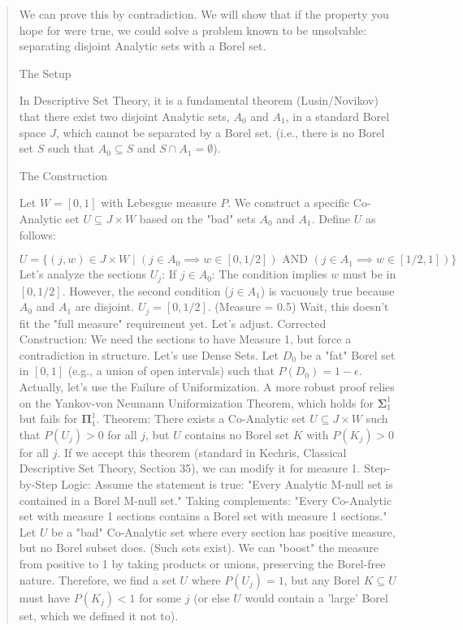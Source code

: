 \begin{Rem}
{\begin{quote}
We can prove this by contradiction. We will show that if the property you hope for were true, we could solve a problem known to be unsolvable: separating disjoint Analytic sets with a Borel set.

The Setup

In Descriptive Set Theory, it is a fundamental theorem (Lusin/Novikov) that there exist two disjoint Analytic sets, $A_0$ and $A_1$, in a standard Borel space $J$, which cannot be separated by a Borel set. (i.e., there is no Borel set $S$ such that $A_0 \subseteq S$ and $S \cap A_1 = \emptyset$).

The Construction

Let $W = [0, 1]$ with Lebesgue measure $P$.
We construct a specific Co-Analytic set $U \subseteq J \times W$ based on the "bad" sets $A_0$ and $A_1$.
Define $U$ as follows:


$$U = \{ (j, w) \in J \times W \mid (j \in A_0 \implies w \in [0, 1/2]) \text{ AND } (j \in A_1 \implies w \in [1/2, 1]) \}$$
Let's analyze the sections $U_j$:
If $j \in A_0$: The condition implies $w$ must be in $[0, 1/2]$. However, the second condition ($j \in A_1$) is vacuously true because $A_0$ and $A_1$ are disjoint.
$U_j = [0, 1/2]$. (Measure = 0.5)
Wait, this doesn't fit the "full measure" requirement yet. Let's adjust.
Corrected Construction:
We need the sections to have Measure 1, but force a contradiction in structure.
Let's use Dense Sets.
Let $D_0$ be a "fat" Borel set in $[0,1]$ (e.g., a union of open intervals) such that $P(D_0) = 1 - \epsilon$.
Actually, let's use the Failure of Uniformization.
A more robust proof relies on the Yankov-von Neumann Uniformization Theorem, which holds for $\mathbf{\Sigma}^1_1$ but fails for $\mathbf{\Pi}^1_1$.
Theorem: There exists a Co-Analytic set $U \subseteq J \times W$ such that $P(U_j) > 0$ for all $j$, but $U$ contains no Borel set $K$ with $P(K_j) > 0$ for all $j$.
If we accept this theorem (standard in Kechris, Classical Descriptive Set Theory, Section 35), we can modify it for measure 1.
Step-by-Step Logic:
Assume the statement is true: "Every Analytic M-null set is contained in a Borel M-null set."
Taking complements: "Every Co-Analytic set with measure 1 sections contains a Borel set with measure 1 sections."
Let $U$ be a "bad" Co-Analytic set where every section has positive measure, but no Borel subset does. (Such sets exist).
We can "boost" the measure from positive to 1 by taking products or unions, preserving the Borel-free nature.
Therefore, we find a set $U$ where $P(U_j) = 1$, but any Borel $K \subseteq U$ must have $P(K_j) < 1$ for some $j$ (or else $U$ would contain a 'large' Borel set, which we defined it not to).


\end{quote}}
\end{Rem}
